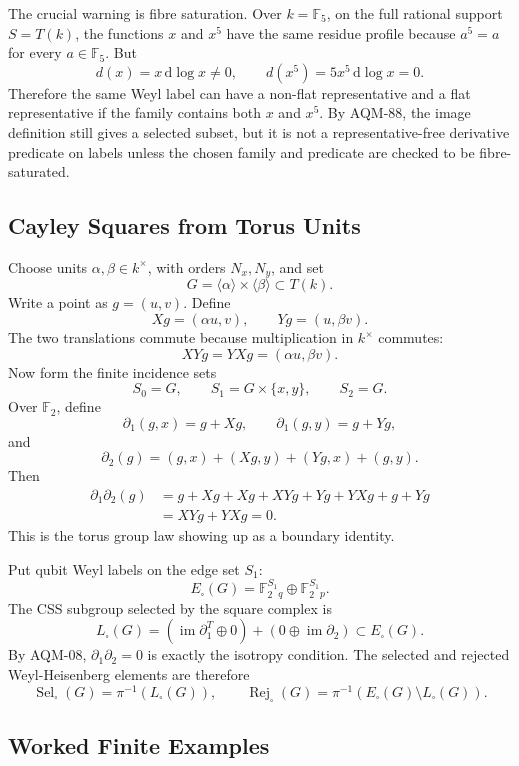 The crucial warning is fibre saturation.  Over \(k=\mathbb F_5\), on the full
rational support \(S=T(k)\), the functions \(x\) and \(x^5\) have the same
residue profile because \(a^5=a\) for every \(a\in\mathbb F_5\).  But
\[
  d(x)=x\,\mathrm d\log x\ne0,\qquad
  d(x^5)=5x^5\,\mathrm d\log x=0.
\]
Therefore the same Weyl label can have a non-flat representative and a flat
representative if the family contains both \(x\) and \(x^5\).  By AQM-88, the
image definition still gives a selected subset, but it is not a
representative-free derivative predicate on labels unless the chosen family
and predicate are checked to be fibre-saturated.

\subsection{Cayley Squares from Torus Units}

Choose units \(\alpha,\beta\in k^\times\), with orders \(N_x,N_y\), and set
\[
  G=\langle\alpha\rangle\times\langle\beta\rangle\subset T(k).
\]
Write a point as \(g=(u,v)\).  Define
\[
  Xg=(\alpha u,v),\qquad Yg=(u,\beta v).
\]
The two translations commute because multiplication in \(k^\times\) commutes:
\[
  XYg=YXg=(\alpha u,\beta v).
\]
Now form the finite incidence sets
\[
  S_0=G,\qquad S_1=G\times\{x,y\},\qquad S_2=G.
\]
Over \(\mathbb F_2\), define
\[
  \partial_1(g,x)=g+Xg,\qquad
  \partial_1(g,y)=g+Yg,
\]
and
\[
  \partial_2(g)=(g,x)+(Xg,y)+(Yg,x)+(g,y).
\]
Then
\[
\begin{aligned}
\partial_1\partial_2(g)
&=g+Xg+Xg+XYg+Yg+YXg+g+Yg\\
&=XYg+YXg=0 .
\end{aligned}
\]
This is the torus group law showing up as a boundary identity.

Put qubit Weyl labels on the edge set \(S_1\):
\[
  E_\square(G)=\mathbb F_2^{S_1}{}_q\oplus\mathbb F_2^{S_1}{}_p.
\]
The CSS subgroup selected by the square complex is
\[
  L_\square(G)=
  (\operatorname{im}\partial_1^T\oplus0)+(0\oplus\operatorname{im}\partial_2)
  \subset E_\square(G).
\]
By AQM-08, \(\partial_1\partial_2=0\) is exactly the isotropy condition.  The
selected and rejected Weyl-Heisenberg elements are therefore
\[
  \operatorname{Sel}_\square(G)=\pi^{-1}(L_\square(G)),\qquad
  \operatorname{Rej}_\square(G)=
  \pi^{-1}(E_\square(G)\setminus L_\square(G)).
\]

\subsection{Worked Finite Examples}

